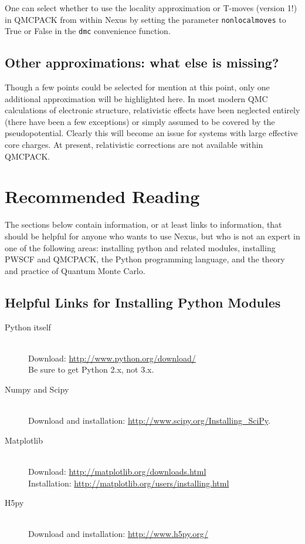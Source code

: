 \documentclass[oneside,11pt]{memoir}
\numberwithin{equation}{section}
\begin{document}
One can select whether to use the locality approximation or T-moves 
(version 1!) in QMCPACK from within Nexus by setting the 
parameter \texttt{nonlocalmoves} to True or False in the \texttt{dmc} 
convenience function.


\section{Other approximations: what else is missing?}
Though a few points could be selected for mention at this point, only one 
additional approximation will be highlighted here.  In most modern QMC 
calculations of electronic structure, relativistic effects have been neglected 
entirely (there have been a few exceptions) or simply assumed to be covered 
by the pseudopotential.  Clearly this will become an issue for systems with 
large effective core charges.  At present, relativistic corrections are not 
available within QMCPACK.



\pagebreak
\chapter{Recommended Reading} \label{reading}
The sections below contain information, or at least links to information, 
that should be helpful for anyone who wants to use Nexus, but who 
is not an expert in one of the following areas: installing python and related 
modules, installing PWSCF and QMCPACK, the Python programming language, and 
the theory and practice of Quantum Monte Carlo.  


\section{Helpful Links for Installing Python Modules} \label{install_python}
\begin{description}
  \item[Python itself] \hfill \\
    Download: \url{http://www.python.org/download/}\\  
    Be sure to get Python 2.x, not 3.x.
  \item[Numpy and Scipy] \hfill \\
    Download and installation: \url{http://www.scipy.org/Installing_SciPy}.
  \item[Matplotlib] \hfill \\
    Download: \url{http://matplotlib.org/downloads.html}\\
    Installation: \url{http://matplotlib.org/users/installing.html}
  \item[H5py] \hfill \\
    Download and installation: \url{http://www.h5py.org/}
\end{description}
\end{document}

